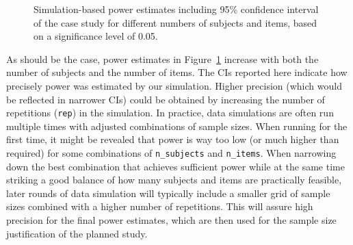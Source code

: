 \documentclass[
  man,
  floatsintext,
  longtable,
  a4paper,
  nolmodern,
  notxfonts,
  notimes,
  colorlinks=true,linkcolor=blue,citecolor=blue,urlcolor=blue]{apa7}
\begin{document}
\begin{figure}[H]

\caption{\label{fig-finalpwr}Simulation-based power estimates including
95\% confidence interval of the case study for different numbers of
subjects and items, based on a significance level of 0.05.}


\end{figure}%

As should be the case, power estimates in Figure~\ref{fig-finalpwr}
increase with both the number of subjects and the number of items. The
CIs reported here indicate how precisely power was estimated by our
simulation. Higher precision (which would be reflected in narrower CIs)
could be obtained by increasing the number of repetitions (\texttt{rep})
in the simulation. In practice, data simulations are often run multiple
times with adjusted combinations of sample sizes. When running for the
first time, it might be revealed that power is way too low (or much
higher than required) for some combinations of \texttt{n\_subjects} and
\texttt{n\_items}. When narrowing down the best combination that
achieves sufficient power while at the same time striking a good balance
of how many subjects and items are practically feasible, later rounds of
data simulation will typically include a smaller grid of sample sizes
combined with a higher number of repetitions. This will assure high
precision for the final power estimates, which are then used for the
sample size justification of the planned study.
\end{document}
